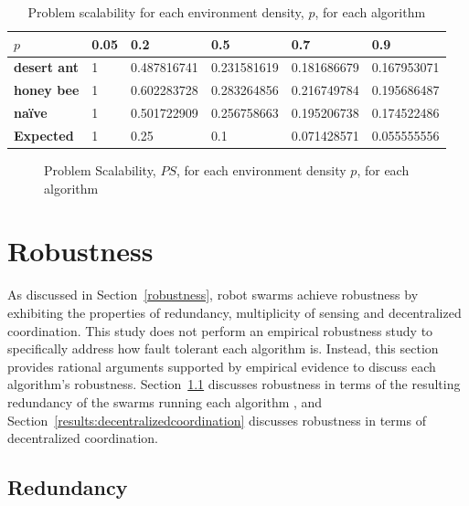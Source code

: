 \begin{table}[]
\centering
\caption{Problem scalability for each environment density, $p$, for each algorithm}
\label{table:problemscalability}
\begin{tabular}{@{}llllll@{}}
\toprule
\textbf{$p$}                  & \textbf{0.05} & \textbf{0.2        } & \textbf{0.5}         & \textbf{0.7}         & \textbf{0.9}         \\ \midrule
\textbf{desert ant}           & 1    & 0.487816741 & 0.231581619 & 0.181686679 & 0.167953071 \\
\textbf{honey bee}            & 1    & 0.602283728 & 0.283264856 & 0.216749784 & 0.195686487 \\
\textbf{na\"ive}              & 1    & 0.501722909 & 0.256758663 & 0.195206738 & 0.174522486 \\
\textbf{Expected} & 1    & 0.25        & 0.1         & 0.071428571 & 0.055555556 \\ \bottomrule
\end{tabular}
\end{table}

\begin{figure}[!htb]
\centering
\resizebox{\textwidth}{!}{}
\caption{Problem Scalability, $PS$, for each environment density $p$, for each algorithm}
\label{fig:problemscalability}
\end{figure}

\section{Robustness}
\label{results:robustness}
As discussed in Section~\ref{robustness}, robot swarms achieve robustness by exhibiting the properties of redundancy, multiplicity of sensing and decentralized coordination. This study does not perform an empirical robustness study to specifically address how fault tolerant each algorithm is. Instead, this section provides rational arguments supported by empirical evidence to discuss each algorithm's robustness. Section~\ref{results:redundancy} discusses robustness in terms of the resulting redundancy of the swarms running each algorithm , and Section~\ref{results:decentralizedcoordination} discusses robustness in terms of decentralized coordination.

\subsection{Redundancy}
\label{results:redundancy}

